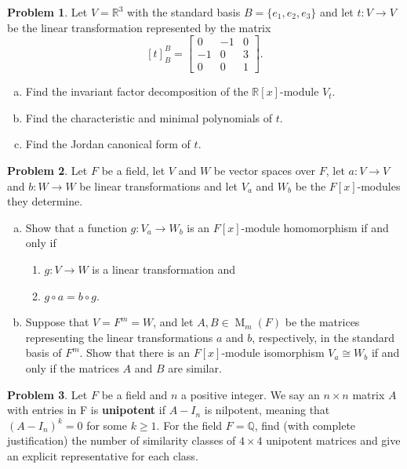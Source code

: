 \documentclass[11pt]{article}
\DeclareMathOperator{\M}{M}
\newcommand{\Q}{\mathbb{Q}}
\newcommand{\R}{\mathbb{R}}
\theoremstyle{definition}
\newtheorem{problem}{Problem}
\begin{document}
\begin{problem}
Let $V = \R^3$ with the standard basis $B=\{e_1,e_2,e_3\}$ and let $t: V \to V$ be the linear transformation represented by the matrix 
$$[t]_B^B =
\begin{bmatrix}
0	&	-1	&	0\\
-1	&	0	&	3\\	
0	&	0	&	1	
\end{bmatrix}.$$ 

\begin{enumerate}[a)]
\item Find the invariant factor decomposition of the $\R[x]$-module $V_t$. 
\item Find the characteristic and minimal polynomials of $t$.
\item Find the Jordan canonical form of $t$.
\end{enumerate}	
\end{problem}


\vfill


\begin{problem}
Let $F$ be a field, let $V$ and $W$ be vector spaces over $F$, let $a\!: V \to V$ and $b\!:W \to W$ be linear transformations and let $V_a$ and $W_b$ be the $F[x]$-modules they determine. 
\begin{enumerate}[a)]
\item Show that a function $g: V_a \to W_b$ is an $F[x]$-module homomorphism if and only if 
\begin{enumerate}[(1)]
\item $g: V \to W$ is a linear transformation and 
\item $g \circ a = b \circ g$.
\end{enumerate} 
\item Suppose that $V = F^m = W$, and let $A, B \in \M_m(F)$ be the matrices representing the linear transformations $a$ and $b$, respectively, in the standard basis of $F^m$. Show that there is an $F[x]$-module isomorphism $V_a \cong W_b$ if and only if the matrices $A$ and $B$ are similar.
\end{enumerate}
\end{problem}

\vfill

\begin{problem}
Let $F$ be a field and $n$ a positive integer. We say an $n \times n$ matrix $A$ with entries in F is {\bf unipotent} if $A-I_n$ is nilpotent, meaning that $(A-I_n)^k = 0$ for some $k \geqslant 1$. For the field $F = \Q$, find (with complete justification) the number of similarity classes of $4 \times 4$ unipotent matrices and give an explicit representative for each class.
\end{problem}
\end{document}
